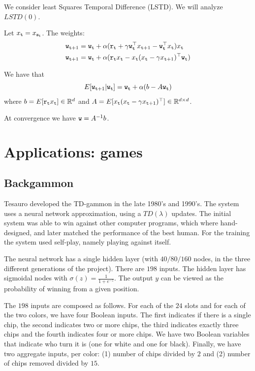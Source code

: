 \begin{leftbar}
We consider least Squares Temporal Difference (LSTD). We will
analyze $LSTD(0)$.

Let $x_{\tt t}=x_{{\tt s}_{\tt t}}$. The weights:
\begin{align*}
{\tt w}_{{\tt t}+1} &= {\tt w}_{\tt t} +\alpha ({\tt r}_{\tt t}+\gamma
{\tt w}_{\tt t}^\top x_{{\tt t}+1}-{\tt w}_{\tt t}^\top
x_{\tt t})x_{\tt t}\\
{\tt w}_{{\tt t}+1} &= {\tt w}_{\tt t} +\alpha ({\tt r}_{\tt t}
x_{\tt t}-x_{\tt t}(x_{\tt t}-\gamma x_{{\tt t}+1})^\top {\tt w}_{\tt t})
\end{align*}

We have that
\[
E[{\tt w}_{{\tt t}+1}|{\tt w}_{\tt t}]={\tt w}_{\tt t} +\alpha
(b-A{\tt w}_{\tt t})
\]
where $b=E[{\tt r}_{\tt t} x_{\tt t}]\in \mathbb{R}^d$ and
$A=E[x_{\tt t}(x_{\tt t}-\gamma x_{{\tt t}+1})^\top]\in\mathbb{R}^{d\times
d}$.

At convergence we have ${\tt w}=A^{-1}b$.

\end{leftbar}


\section{Applications: games}

\subsection{Backgammon}

Tesauro developed the TD-gammon in the late 1980's and 1990's. The
system uses a neural network approximation, using a $TD(\lambda)$
updates. The initial system was able to win against other computer
programs, which where hand-designed, and later matched the
performance of the best human. For the training the system used
self-play, namely playing against itself.

The neural network has a single hidden layer (with $40/80/160$
nodes, in the three different generations of the project). There are
$198$ inputs. The hidden layer has sigmoidal nodes with
$\sigma(z)=\frac{1}{1+e^{-z}}$. The output $y$ can be viewed as the
probability of winning from a given position.

The $198$ inputs are composed as follows. For each of the $24$ slots
and for each of the two colors, we have four Boolean inputs. The
first indicates if there is a single chip, the second indicates two
or more chips, the third indicates exactly three chips and the
fourth indicates four or more chips. We have two Boolean variables
that indicate who turn it is (one for white and one for black).
Finally, we have two aggregate inputs, per color: (1) number of
chips divided by $2$ and (2) number of chips removed divided by
$15$.

